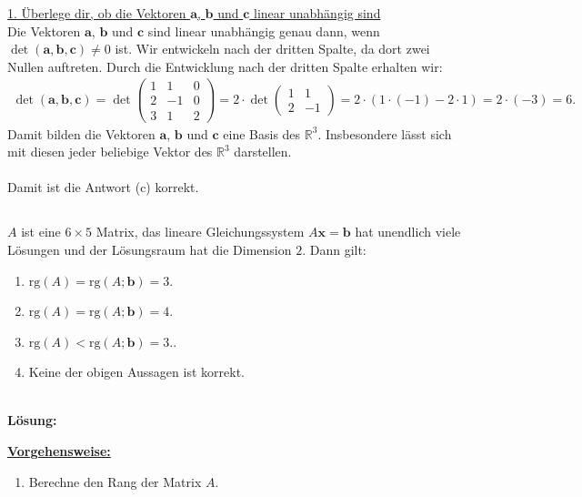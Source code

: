 \underline{1. Überlege dir, ob die Vektoren $ \textbf{a} $, $ \textbf{b} $ und $ \textbf{c} $ linear unabhängig sind}\\
Die Vektoren $ \textbf{a} $, $ \textbf{b} $ und $ \textbf{c} $
sind linear unabhängig genau dann, wenn
$ \det( \textbf{a} ,  \textbf{b}, \textbf{c} ) \neq 0$ ist.
Wir entwickeln nach der dritten Spalte, da dort zwei Nullen auftreten.
Durch die Entwicklung nach der dritten Spalte erhalten wir:
\begin{align*}
\det( \textbf{a} ,  \textbf{b}, \textbf{c} )
=
\det
\begin{pmatrix}
1 & 1 & 0\\
2 & -1 & 0\\
3 & 1 & 2
\end{pmatrix}
= 2 \cdot \det 
\begin{pmatrix}
1 & 1\\
2 & -1
\end{pmatrix}
= 
2 \cdot (1 \cdot (-1) - 2 \cdot 1)
=
2 \cdot (-3) = 6.
\end{align*}
Damit bilden die Vektoren $ \textbf{a} $, $ \textbf{b} $ und $ \textbf{c} $ eine Basis des $ \mathbb{R}^3 $.
Insbesondere lässt sich mit diesen jeder beliebige Vektor des $ \mathbb{R}^3 $ darstellen.\\
\\
Damit ist die Antwort (c) korrekt.
\newpage

\subsection*{}
$ A $ ist eine $ 6 \times 5 $ Matrix, das lineare Gleichungssystem $ A \textbf{x} = \textbf{b} $ hat unendlich viele Lösungen und der Lösungsraum hat die Dimension $ 2 $.
Dann gilt:
\renewcommand{\labelenumi}{(\alph{enumi})}
\begin{enumerate}
	\item 
	$ \text{rg}(A) = \text{rg}(A; \textbf{b}) = 3 $.
	\item
	$ \text{rg}(A) = \text{rg}(A; \textbf{b}) = 4 $.
	\item
	$ \text{rg}(A) < \text{rg}(A; \textbf{b}) = 3 $..
	\item
	Keine der obigen Aussagen ist korrekt.
\end{enumerate}
\ \\
\textbf{Lösung:}
\begin{mdframed}
\underline{\textbf{Vorgehensweise:}}
\renewcommand{\labelenumi}{\theenumi.}
\begin{enumerate}
\item Berechne den Rang der Matrix $ A $.
\end{enumerate}
\end{mdframed}

